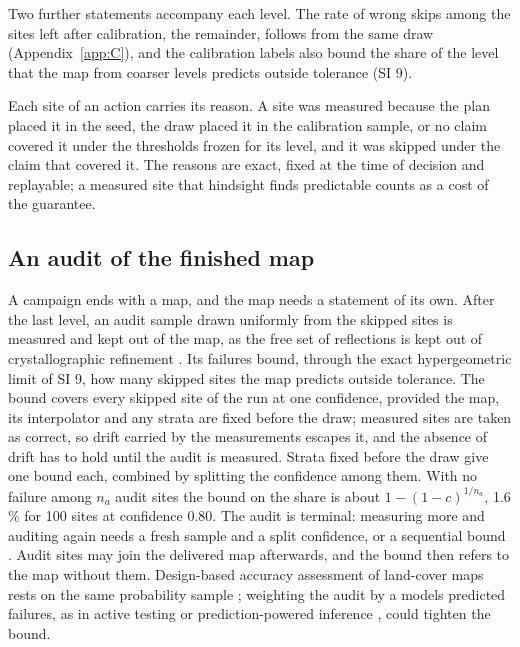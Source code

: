 \documentclass{iopjournal}
\begin{document}
Two further statements accompany each level. The rate of wrong skips among the sites left after calibration, the remainder, follows from the same draw (Appendix~\ref{app:C}), and the calibration labels also bound the share of the level that the map from coarser levels predicts outside tolerance (SI 9).

Each site of an action carries its reason. A site was measured because the plan placed it in the seed, the draw placed it in the calibration sample, or no claim covered it under the thresholds frozen for its level, and it was skipped under the claim that covered it. The reasons are exact, fixed at the time of decision and replayable; a measured site that hindsight finds predictable counts as a cost of the guarantee.

\hypertarget{sec:3-6}{%
\subsection{An audit of the finished map}\label{sec:3-6}}

A campaign ends with a map, and the map needs a statement of its own. After the last level, an audit sample drawn uniformly from the skipped sites is measured and kept out of the map, as the free set of reflections is kept out of crystallographic refinement \cite{Brunger1992}. Its failures bound, through the exact hypergeometric limit of SI 9, how many skipped sites the map predicts outside tolerance. The bound covers every skipped site of the run at one confidence, provided the map, its interpolator and any strata are fixed before the draw; measured sites are taken as correct, so drift carried by the measurements escapes it, and the absence of drift has to hold until the audit is measured. Strata fixed before the draw give one bound each, combined by splitting the confidence among them. With no failure among \(n_a\) audit sites the bound on the share is about \(1 - (1 - c)^{1/n_a}\), 1.6 \% for 100 sites at confidence 0.80. The audit is terminal: measuring more and auditing again needs a fresh sample and a split confidence, or a sequential bound \cite{WaudbySmith2020}. Audit sites may join the delivered map afterwards, and the bound then refers to the map without them. Design-based accuracy assessment of land-cover maps rests on the same probability sample \cite{Olofsson2014}; weighting the audit by a model\textquotesingle s predicted failures, as in active testing \cite{Kossen2021} or prediction-powered inference \cite{AngelopoulosPPI2023}, could tighten the bound.
\end{document}
